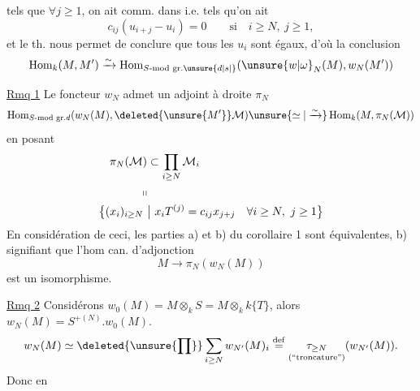 tels que $\forall j\geq1$, on ait comm. dans
i.e. tels qu'on ait
\[
c_{ij}(u_{i+j}-u_i)=0\qquad\text{si}\quad i\geq N,\ j\geq1,
\]
et le th. nous permet de conclure que tous les $u_i$ sont égaux, d'où la conclusion
\[
\operatorname{Hom}_k(M,M')\xrightarrow{\sim}\operatorname{Hom}_{S\text{-mod gr.}\unsure{d|s|{}}}(\unsure{w|\omega}_N(M),w_N(M'))
\]

\uline{Rmq 1} Le foncteur $w_N$ admet un adjoint à droite $\pi_N$
\[
\operatorname{Hom}_{S\text{-mod gr.}d}(w_N(M),\deleted{\unsure{M'}}\mathcal M)\unsure{\simeq|\xrightarrow{\sim}}\operatorname{Hom}_k(M,\pi_N(\mathcal M))
\]
en posant
\[
\begin{aligned}
\pi_N(\mathcal M)&\subset\prod_{i\geq N}\mathcal M_i\\
\shortparallel&\\
\bigl\{(x_i)_{i\geq N}\ &\big|\ x_iT^{(j)}=c_{ij}x_{j+j}\quad\forall i\geq N,\ j\geq1\bigr\}
\end{aligned}
\]
En considération de ceci,  les parties a) et b) du corollaire 1 sont équivalentes, b) signifiant que l'hom can. d'adjonction
\[
M\longrightarrow\pi_N(w_N(M))
\]
est  un isomorphisme.

\uline{Rmq 2} Considérons $w_0(M)=M\otimes_k S=M\otimes_k k\{T\}$, alors $w_N(M)=S^{+(N)}.w_0(M)$.  
\[
w_N(M)\simeq\deleted{\unsure{\prod}}\sum_{i\geq N}w_{N'}(M)_i\overset{\mathrm{def}}{=}\underset{\text{(``troncature'')}}{\tau_{\geq N}}(w_{N'}(M)).
\]
Donc en


